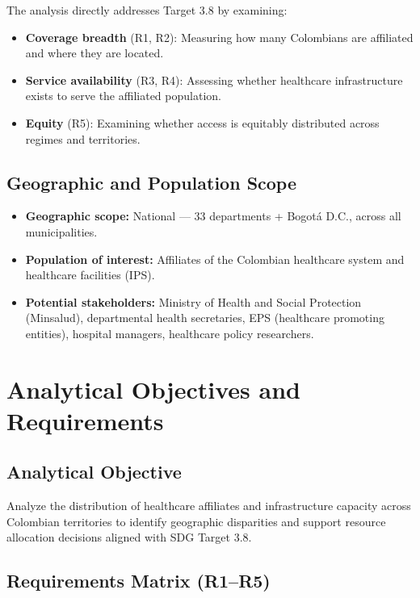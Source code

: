 \documentclass[12pt,a4paper]{article}
\begin{document}
The analysis directly addresses Target 3.8 by examining:
\begin{itemize}[nosep]
    \item \textbf{Coverage breadth} (R1, R2): Measuring how many Colombians are affiliated and where they are located.
    \item \textbf{Service availability} (R3, R4): Assessing whether healthcare infrastructure exists to serve the affiliated population.
    \item \textbf{Equity} (R5): Examining whether access is equitably distributed across regimes and territories.
\end{itemize}

\subsection{Geographic and Population Scope}

\begin{itemize}[nosep]
    \item \textbf{Geographic scope:} National --- 33 departments + Bogot\'{a} D.C., across all municipalities.
    \item \textbf{Population of interest:} Affiliates of the Colombian healthcare system and healthcare facilities (IPS).
    \item \textbf{Potential stakeholders:} Ministry of Health and Social Protection (Minsalud), departmental health secretaries, EPS (healthcare promoting entities), hospital managers, healthcare policy researchers.
\end{itemize}

\section{Analytical Objectives and Requirements}

\subsection{Analytical Objective}

Analyze the distribution of healthcare affiliates and infrastructure capacity across Colombian territories to identify geographic disparities and support resource allocation decisions aligned with SDG Target 3.8.

\subsection{Requirements Matrix (R1--R5)}
\end{document}
